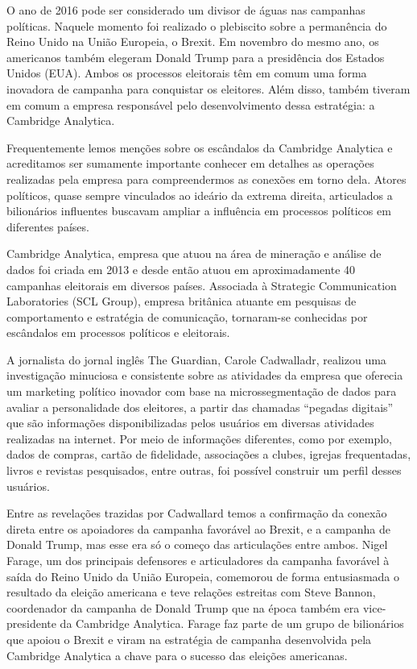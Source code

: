 O ano de 2016 pode ser considerado um divisor de águas nas campanhas
políticas. Naquele momento foi realizado o plebiscito sobre a
permanência do Reino Unido na União Europeia, o Brexit. Em novembro do
mesmo ano, os americanos também elegeram Donald Trump para a presidência
dos Estados Unidos (EUA). Ambos os processos eleitorais têm em comum uma
forma inovadora de campanha para conquistar os eleitores. Além disso,
também tiveram em comum a empresa responsável pelo desenvolvimento dessa
estratégia: a Cambridge Analytica.

Frequentemente lemos menções sobre os escândalos da Cambridge Analytica
e acreditamos ser sumamente importante conhecer em detalhes as operações
realizadas pela empresa para compreendermos as conexões em torno dela.
Atores políticos, quase sempre vinculados ao ideário da extrema direita,
articulados a bilionários influentes buscavam ampliar a influência em
processos políticos em diferentes países.

Cambridge Analytica, empresa que atuou na área de mineração e análise de
dados foi criada em 2013 e desde então atuou em aproximadamente 40
campanhas eleitorais em diversos países. Associada à Strategic
Communication Laboratories (SCL Group), empresa britânica atuante em
pesquisas de comportamento e estratégia de comunicação, tornaram-se
conhecidas por escândalos em processos políticos e eleitorais.

A jornalista do jornal inglês The Guardian, Carole Cadwalladr, realizou
uma investigação minuciosa e consistente sobre as atividades da empresa
que oferecia um marketing político inovador com base na
microssegmentação de dados para avaliar a personalidade dos eleitores, a
partir das chamadas ``pegadas digitais'' que são informações
disponibilizadas pelos usuários em diversas atividades realizadas na
internet. Por meio de informações diferentes, como por exemplo, dados de
compras, cartão de fidelidade, associações a clubes, igrejas
frequentadas, livros e revistas pesquisados, entre outras, foi possível
construir um perfil desses usuários.

Entre as revelações trazidas por Cadwallard temos a confirmação da
conexão direta entre os apoiadores da campanha favorável ao Brexit, e a
campanha de Donald Trump, mas esse era só o começo das articulações
entre ambos. Nigel Farage, um dos principais defensores e articuladores
da campanha favorável à saída do Reino Unido da União Europeia,
comemorou de forma entusiasmada o resultado da eleição americana e teve
relações estreitas com Steve Bannon, coordenador da campanha de Donald
Trump que na época também era vice-presidente da Cambridge Analytica.
Farage faz parte de um grupo de bilionários que apoiou o Brexit e viram
na estratégia de campanha desenvolvida pela Cambridge Analytica a chave
para o sucesso das eleições americanas.

